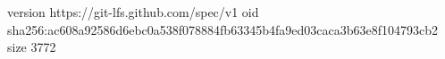 version https://git-lfs.github.com/spec/v1
oid sha256:ac608a92586d6ebc0a538f078884fb63345b4fa9ed03caca3b63e8f104793cb2
size 3772
